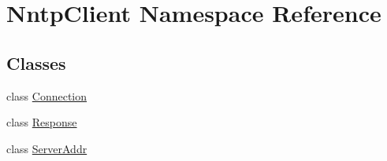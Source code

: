 \hypertarget{namespace_nntp_client}{}\section{Nntp\+Client Namespace Reference}
\label{namespace_nntp_client}
\subsection*{Classes}
\begin{DoxyCompactItemize}
\item 
class \hyperlink{class_nntp_client_1_1_connection}{Connection}
\item 
class \hyperlink{class_nntp_client_1_1_response}{Response}
\item 
class \hyperlink{class_nntp_client_1_1_server_addr}{Server\+Addr}
\end{DoxyCompactItemize}
